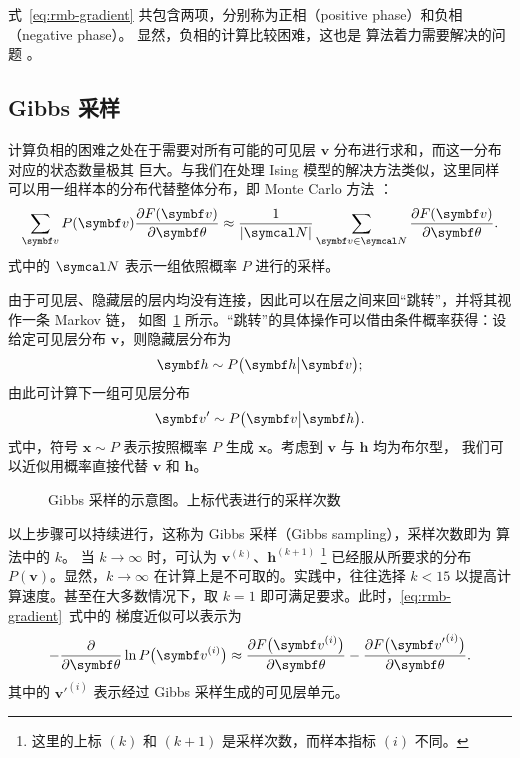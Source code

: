 式~\eqref{eq:rmb-gradient} 共包含两项，分别称为正相（positive phase）和负相（negative phase）。
显然，负相的计算比较困难，这也是 \CDk{} 算法着力需要解决的问题 \cite{rbmonline}。

\subsection{Gibbs 采样}

计算负相的困难之处在于需要对所有可能的可见层 $\bm{v}$ 分布进行求和，而这一分布对应的状态数量极其
巨大。与我们在处理 Ising 模型的解决方法类似，这里同样可以用一组样本的分布代替整体分布，即 Monte
Carlo 方法 \cite{rbmonline}：
\begin{equation}
  \sum_{\bm{v}} P(\bm{v}) \pdv{F(\bm{v})}{\bm{\theta}}
  \approx \frac{1}{\abs{\domN}} \sum_{\bm{v}\in\domN} \pdv{F(\bm{v})}{\bm{\theta}}.
\end{equation}
式中的 $\domN$ 表示一组依照概率 $P$ 进行的采样。

由于可见层、隐藏层的层内均没有连接，因此可以在层之间来回“跳转”，并将其视作一条 Markov 链，
如图~\ref{fig:gibbs-sampling} 所示。“跳转”的具体操作可以借由条件概率获得：设给定可见层分布
$\bm{v}$，则隐藏层分布为
\begin{equation}
  \label{eq:hidden-layer-dist}
  \bm{h} \sim P\qty\big(\bm{h}\big|\bm{v});
\end{equation}
由此可计算下一组可见层分布
\begin{equation}
  \label{eq:visible-layer-dist}
  \bm{v}' \sim P\qty\big(\bm{v}\big|\bm{h}).
\end{equation}
式中，符号 $\bm{x}\sim P$ 表示按照概率 $P$ 生成 $\bm{x}$。考虑到 $\bm{v}$ 与 $\bm{h}$ 均为布尔型，
我们可以近似用概率直接代替 $\bm{v}$ 和 $\bm{h}$。

\begin{figure}[htb]
  \centering
  \caption{Gibbs 采样的示意图。上标代表进行的采样次数}
  \label{fig:gibbs-sampling}
\end{figure}

以上步骤可以持续进行，这称为 Gibbs 采样（Gibbs sampling），采样次数即为 \CDk{} 算法中的 $k$。
当 $k\to\infty$ 时，可认为 $\bm{v}^{(k)}$、$\bm{h}^{(k+1)}$
\footnote{这里的上标 $(k)$ 和 $(k+1)$ 是采样次数，而样本指标 $(i)$ 不同。}
已经服从所要求的分布 $P(\bm{v})$。显然，$k\to\infty$ 在计算上是不可取的。实践中，往往选择 $k<15$
以提高计算速度。甚至在大多数情况下，取 $k=1$ 即可满足要求。此时，\eqref{eq:rmb-gradient}~式中的
梯度近似可以表示为 \cite{rbmonline,hinton2012practical,hinton2002training}
\begin{equation}
  \label{eq:rmb-gradient-approx}
  - \pdv{\bm{\theta}} \ln P\qty\big(\bm{v}^{(i)})
  \approx \pdv{F\qty\big(\bm{v}^{(i)})}{\bm{\theta}}
        - \pdv{F\qty\big({\bm{v}'}^{(i)})}{\bm{\theta}}.
\end{equation}
其中的 ${\bm{v}'}^{(i)}$ 表示经过 Gibbs 采样生成的可见层单元。

